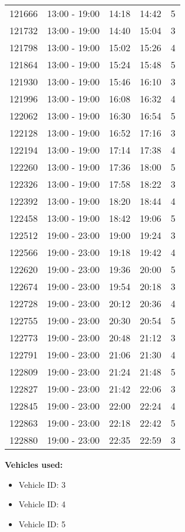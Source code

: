 \documentclass{article}
\begin{document}
\begin{tabular}{llccc}
121666 & 13:00 - 19:00 & 14:18 & 14:42 & 5 \\
121732 & 13:00 - 19:00 & 14:40 & 15:04 & 3 \\
121798 & 13:00 - 19:00 & 15:02 & 15:26 & 4 \\
121864 & 13:00 - 19:00 & 15:24 & 15:48 & 5 \\
121930 & 13:00 - 19:00 & 15:46 & 16:10 & 3 \\
121996 & 13:00 - 19:00 & 16:08 & 16:32 & 4 \\
122062 & 13:00 - 19:00 & 16:30 & 16:54 & 5 \\
122128 & 13:00 - 19:00 & 16:52 & 17:16 & 3 \\
122194 & 13:00 - 19:00 & 17:14 & 17:38 & 4 \\
122260 & 13:00 - 19:00 & 17:36 & 18:00 & 5 \\
122326 & 13:00 - 19:00 & 17:58 & 18:22 & 3 \\
122392 & 13:00 - 19:00 & 18:20 & 18:44 & 4 \\
122458 & 13:00 - 19:00 & 18:42 & 19:06 & 5 \\
122512 & 19:00 - 23:00 & 19:00 & 19:24 & 3 \\
122566 & 19:00 - 23:00 & 19:18 & 19:42 & 4 \\
122620 & 19:00 - 23:00 & 19:36 & 20:00 & 5 \\
122674 & 19:00 - 23:00 & 19:54 & 20:18 & 3 \\
122728 & 19:00 - 23:00 & 20:12 & 20:36 & 4 \\
122755 & 19:00 - 23:00 & 20:30 & 20:54 & 5 \\
122773 & 19:00 - 23:00 & 20:48 & 21:12 & 3 \\
122791 & 19:00 - 23:00 & 21:06 & 21:30 & 4 \\
122809 & 19:00 - 23:00 & 21:24 & 21:48 & 5 \\
122827 & 19:00 - 23:00 & 21:42 & 22:06 & 3 \\
122845 & 19:00 - 23:00 & 22:00 & 22:24 & 4 \\
122863 & 19:00 - 23:00 & 22:18 & 22:42 & 5 \\
122880 & 19:00 - 23:00 & 22:35 & 22:59 & 3 \\
\bottomrule
\end{tabular}

\textbf{Vehicles used:}
\begin{itemize}
  \item Vehicle ID: 3
  \item Vehicle ID: 4
  \item Vehicle ID: 5
\end{itemize}
\end{document}
